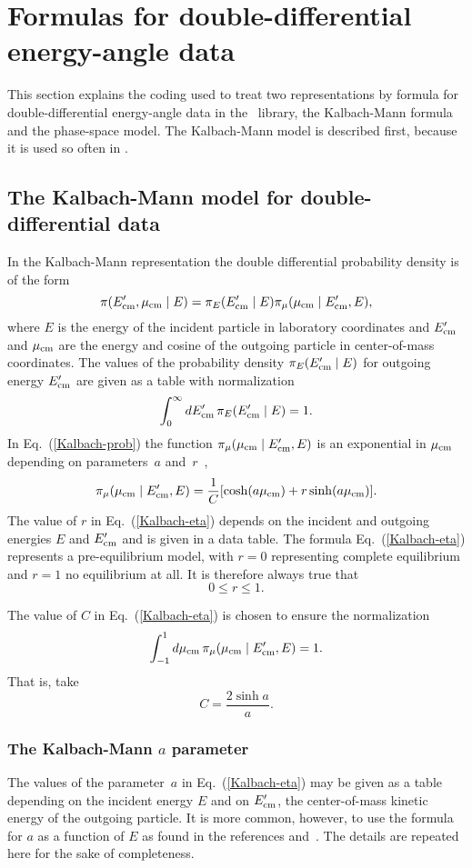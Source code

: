 \chapter{Formulas for double-differential energy-angle data}
\label{Sec:double-diff-formula}
This section explains the coding used to treat two representations
by formula for double-differential energy-angle data in the \xendl\ library,
the Kalbach-Mann formula and the phase-space model.  The
Kalbach-Mann model is described first, because it is used so often in \xendl.

\section{The Kalbach-Mann model for double-differential data}
In the Kalbach-Mann representation \cite{Kalbach} the
double differential probability density is of the form
\begin{equation}
  \pi(E_{\text{cm}}', \mu_{\text{cm}} \mid E) =
  \pi_E( E_{\text{cm}}' \mid E) \pi_\mu( \mu_{\text{cm}} \mid E_{\text{cm}}', E ),
  \label{Kalbach-prob}
\end{equation}
where $E$ is the energy of the incident particle in laboratory
coordinates and $E_{\text{cm}}'$ and $\mu_{\text{cm}}$ are the energy and cosine of
the outgoing particle in center-of-mass coordinates.
The values of the probability density $\pi_E( E_{\text{cm}}' \mid E)$ for outgoing 
energy $E_{\text{cm}}'$
are given as a table with normalization
$$
  \int_0^\infty dE_{\text{cm}}' \, \pi_E( E_{\text{cm}}' \mid E) = 1.
$$
In Eq.~(\ref{Kalbach-prob}) the function
$\pi_\mu( \mu_{\text{cm}} \mid E_{\text{cm}}', E )$ is an exponential in
$\mu_{\text{cm}}$ depending on parameters~$a$ and~$r$~\cite{Kalbach},
\begin{equation}
  \pi_\mu( \mu_{\text{cm}} \mid E_{\text{cm}}', E ) =
    \frac{1}{C}
    [ \cosh(a\mu_{\text{cm}}) + r \sinh(a\mu_{\text{cm}})].
  \label{Kalbach-eta}
\end{equation}
The value of $r$ in Eq.~(\ref{Kalbach-eta}) depends on the incident and outgoing energies 
$E$ and $E_{\text{cm}}'$ and is given in a data table.  The formula Eq.~(\ref{Kalbach-eta})
represents a pre-equilibrium model, with $r=0$ representing complete
equilibrium and $r = 1$ no equilibrium at all.  It is therefore always true
that
$$
  0 \le r \le 1.
$$

The value of $C$ in Eq.~(\ref{Kalbach-eta}) is chosen to ensure the normalization
$$
  \int_{-1}^1 d\mu_{\text{cm}} \, \pi_\mu( \mu_{\text{cm}} \mid E_{\text{cm}}', E ) = 1.
$$
That is, take
$$
  C = \frac{ 2 \sinh{a}}{a}.
$$

\subsection{The Kalbach-Mann $a$ parameter}
The values of the parameter~$a$ in Eq.~(\ref{Kalbach-eta}) may be given
as a table depending on the incident
energy $E$ and on $E_{\text{cm}}'$, the center-of-mass kinetic energy of
the outgoing particle.  It is more common, however, to use the formula
for $a$ as a function of $E$ as found in the references \cite{Kalbach} and~\cite{ENDFB}.
The details are repeated here for the sake of completeness.

